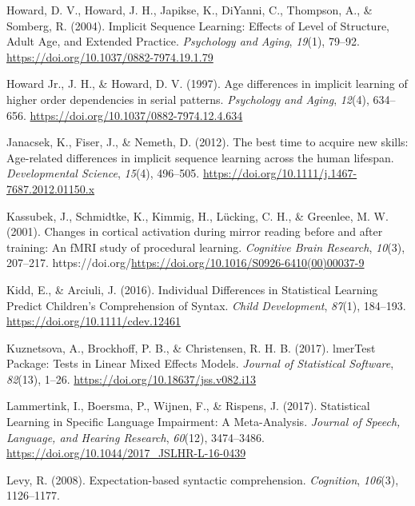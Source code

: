 \documentclass[
  10pt,
  letterpaper]{article}
\newlength{\cslhangindent}
\newenvironment{CSLReferences}[2] %
 {\begin{list}{}{%
  \setlength{\itemindent}{0pt}
  \setlength{\leftmargin}{0pt}
  \setlength{\parsep}{0pt}
  \ifodd #1
   \setlength{\leftmargin}{\cslhangindent}
   \setlength{\itemindent}{-1\cslhangindent}
  \fi
  \setlength{\itemsep}{#2\baselineskip}}}
 {\end{list}}
\begin{document}
\begin{CSLReferences}{1}{0}
Howard, D. V., Howard, J. H., Japikse, K., DiYanni, C., Thompson, A., \&
Somberg, R. (2004). Implicit {Sequence} {Learning}: {Effects} of {Level}
of {Structure}, {Adult} {Age}, and {Extended} {Practice}.
\emph{Psychology and Aging}, \emph{19}(1), 79--92.
\url{https://doi.org/10.1037/0882-7974.19.1.79}

Howard Jr., J. H., \& Howard, D. V. (1997). Age differences in implicit
learning of higher order dependencies in serial patterns.
\emph{Psychology and Aging}, \emph{12}(4), 634--656.
\url{https://doi.org/10.1037/0882-7974.12.4.634}

Janacsek, K., Fiser, J., \& Nemeth, D. (2012). The best time to acquire
new skills: Age-related differences in implicit sequence learning across
the human lifespan. \emph{Developmental Science}, \emph{15}(4),
496--505. \url{https://doi.org/10.1111/j.1467-7687.2012.01150.x}

Kassubek, J., Schmidtke, K., Kimmig, H., Lücking, C. H., \& Greenlee, M.
W. (2001). Changes in cortical activation during mirror reading before
and after training: An {fMRI} study of procedural learning.
\emph{Cognitive Brain Research}, \emph{10}(3), 207--217.
https://doi.org/\url{https://doi.org/10.1016/S0926-6410(00)00037-9}

Kidd, E., \& Arciuli, J. (2016). Individual {Differences} in
{Statistical} {Learning} {Predict} {Children}'s {Comprehension} of
{Syntax}. \emph{Child Development}, \emph{87}(1), 184--193.
\url{https://doi.org/10.1111/cdev.12461}

Kuznetsova, A., Brockhoff, P. B., \& Christensen, R. H. B. (2017).
{lmerTest} {Package}: {Tests} in {Linear} {Mixed} {Effects} {Models}.
\emph{Journal of Statistical Software}, \emph{82}(13), 1--26.
\url{https://doi.org/10.18637/jss.v082.i13}

Lammertink, I., Boersma, P., Wijnen, F., \& Rispens, J. (2017).
Statistical {Learning} in {Specific} {Language} {Impairment}: {A}
{Meta}-{Analysis}. \emph{Journal of Speech, Language, and Hearing
Research}, \emph{60}(12), 3474--3486.
\url{https://doi.org/10.1044/2017_JSLHR-L-16-0439}

Levy, R. (2008). Expectation-based syntactic comprehension.
\emph{Cognition}, \emph{106}(3), 1126--1177.


\end{CSLReferences}
\end{document}
